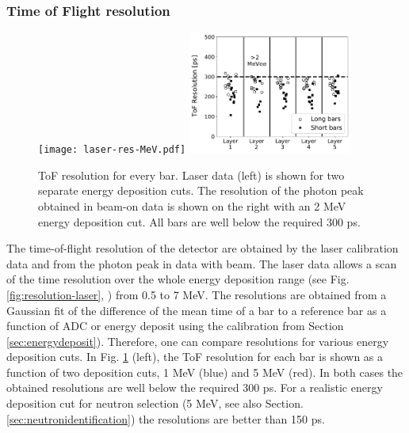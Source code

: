 \documentclass[3p,final,twocolumn]{elsarticle}
\begin{document}
\subsubsection{Time of Flight resolution}
\label{sec:tofresolution}
\begin{figure}[tb]
	\centering
			\texttt{[image: laser-res-MeV.pdf]}
		\includegraphics[width=0.48\textwidth]{tof-resolutions-photons-2MeV.pdf}
	\caption{ToF resolution for every bar. Laser data (left) is shown for two separate energy deposition cuts\protect\footnotemark. The resolution of the photon peak obtained in beam-on data is shown on the right with an 2 \si{\mega\electronvolt} energy deposition cut. All bars are well below the required 300 \si{\pico\s}. }
	\label{fig:tof_resolution}
\end{figure}
\setcounter{footnote}{2}
The time-of-flight resolution of the detector are obtained by the laser calibration data and from the photon peak in data with beam. The laser data allows a scan of the time resolution over the whole energy deposition range (see Fig. \ref{fig:resolution-laser}, \footnotemark {}) from 0.5 to 7 \si{\mega\electronvolt}. The resolutions are obtained from a Gaussian fit of the difference of the mean time of a bar to a reference bar as a function of ADC or energy deposit using the calibration from Section \ref{sec:energydeposit}). Therefore, one can compare resolutions for various energy deposition cuts. In Fig. \ref{fig:tof_resolution} (left), the ToF resolution for each bar is shown as a function of two deposition cuts, 1 \si{\mega\electronvolt} (blue) and 5 \si{\mega\electronvolt} (red). In 
both cases the obtained resolutions are well below the required 300 \si{\pico\s}. For a realistic energy deposition cut for neutron selection (5 \si{\mega\electronvolt}, see also Section. \ref{sec:neutronidentification}) the resolutions are better than 150 \si{\pico\s}.
\end{document}
